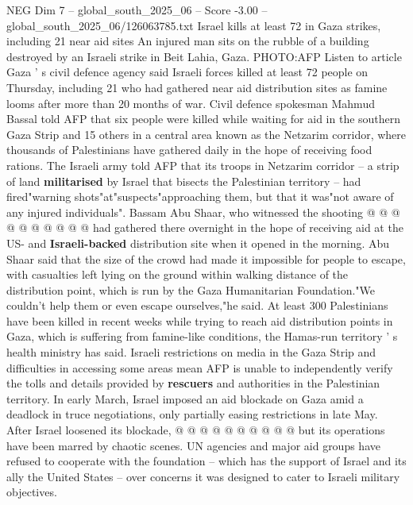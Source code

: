 \begin{textsample}{NEG Dim 7 – global\_south\_2025\_06 – Score -3.00 – global\_south\_2025\_06/126063785.txt}  \label{ex:f7_neg_051}
Israel kills at least 72 in Gaza strikes, including 21 near aid sites An injured man sits on the rubble of a building destroyed by an Israeli strike in Beit Lahia, Gaza.
PHOTO:AFP Listen to article Gaza ' s civil defence agency said Israeli forces killed at least 72 people on Thursday, including 21 who had gathered near aid distribution sites as famine looms after more than 20 months of war.
Civil defence spokesman Mahmud Bassal told AFP that six people were killed while waiting for aid in the southern Gaza Strip and 15 others in a central area known as the Netzarim corridor, where thousands of Palestinians have gathered daily in the hope of receiving food rations.
The Israeli army told AFP that its troops in Netzarim corridor -- a strip of land \textbf{militarised} by Israel that bisects the Palestinian territory -- had fired"warning shots"at"suspects"approaching them, but that it was"not aware of any injured individuals".
Bassam Abu Shaar, who witnessed the shooting @ @ @ @ @ @ @ @ @ @ had gathered there overnight in the hope of receiving aid at the US- and \textbf{Israeli-backed} distribution site when it opened in the morning.
Abu Shaar said that the size of the crowd had made it impossible for people to escape, with casualties left lying on the ground within walking distance of the distribution point, which is run by the Gaza Humanitarian Foundation."We couldn't help them or even escape ourselves,"he said.
At least 300 Palestinians have been killed in recent weeks while trying to reach aid distribution points in Gaza, which is suffering from famine-like conditions, the Hamas-run territory ' s health ministry has said.
Israeli restrictions on media in the Gaza Strip and difficulties in accessing some areas mean AFP is unable to independently verify the tolls and details provided by \textbf{rescuers} and authorities in the Palestinian territory.
In early March, Israel imposed an aid blockade on Gaza amid a deadlock in truce negotiations, only partially easing restrictions in late May.
After Israel loosened its blockade, @ @ @ @ @ @ @ @ @ @ but its operations have been marred by chaotic scenes.
UN agencies and major aid groups have refused to cooperate with the foundation -- which has the support of Israel and its ally the United States -- over concerns it was designed to cater to Israeli military objectives.

\end{textsample}
